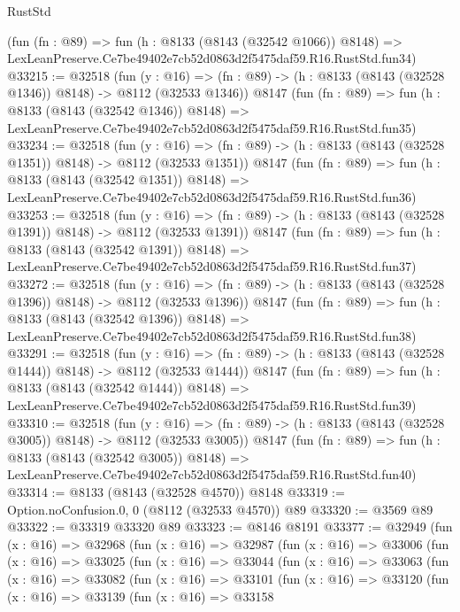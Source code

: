 \begin{lexlean}{RustStd}
\begin{coremodule}
    (fun (fn : @89) =>
    fun (h : @8133 (@8143 (@32542 @1066)) @8148) =>
    LexLeanPreserve.Ce7be49402e7cb52d0863d2f5475daf59.R16.RustStd.fun34)
@33215 := @32518
    (fun (y : @16) =>
    (fn : @89) -> (h : @8133 (@8143 (@32528 @1346)) @8148) -> @8112 (@32533 @1346))
    @8147
    (fun (fn : @89) =>
    fun (h : @8133 (@8143 (@32542 @1346)) @8148) =>
    LexLeanPreserve.Ce7be49402e7cb52d0863d2f5475daf59.R16.RustStd.fun35)
@33234 := @32518
    (fun (y : @16) =>
    (fn : @89) -> (h : @8133 (@8143 (@32528 @1351)) @8148) -> @8112 (@32533 @1351))
    @8147
    (fun (fn : @89) =>
    fun (h : @8133 (@8143 (@32542 @1351)) @8148) =>
    LexLeanPreserve.Ce7be49402e7cb52d0863d2f5475daf59.R16.RustStd.fun36)
@33253 := @32518
    (fun (y : @16) =>
    (fn : @89) -> (h : @8133 (@8143 (@32528 @1391)) @8148) -> @8112 (@32533 @1391))
    @8147
    (fun (fn : @89) =>
    fun (h : @8133 (@8143 (@32542 @1391)) @8148) =>
    LexLeanPreserve.Ce7be49402e7cb52d0863d2f5475daf59.R16.RustStd.fun37)
@33272 := @32518
    (fun (y : @16) =>
    (fn : @89) -> (h : @8133 (@8143 (@32528 @1396)) @8148) -> @8112 (@32533 @1396))
    @8147
    (fun (fn : @89) =>
    fun (h : @8133 (@8143 (@32542 @1396)) @8148) =>
    LexLeanPreserve.Ce7be49402e7cb52d0863d2f5475daf59.R16.RustStd.fun38)
@33291 := @32518
    (fun (y : @16) =>
    (fn : @89) -> (h : @8133 (@8143 (@32528 @1444)) @8148) -> @8112 (@32533 @1444))
    @8147
    (fun (fn : @89) =>
    fun (h : @8133 (@8143 (@32542 @1444)) @8148) =>
    LexLeanPreserve.Ce7be49402e7cb52d0863d2f5475daf59.R16.RustStd.fun39)
@33310 := @32518
    (fun (y : @16) =>
    (fn : @89) -> (h : @8133 (@8143 (@32528 @3005)) @8148) -> @8112 (@32533 @3005))
    @8147
    (fun (fn : @89) =>
    fun (h : @8133 (@8143 (@32542 @3005)) @8148) =>
    LexLeanPreserve.Ce7be49402e7cb52d0863d2f5475daf59.R16.RustStd.fun40)
@33314 := @8133 (@8143 (@32528 @4570)) @8148
@33319 := Option.noConfusion.{0, 0} (@8112 (@32533 @4570)) @89
@33320 := @3569 @89
@33322 := @33319 @33320 @89
@33323 := @8146 @8191
@33377 := @32949
    (fun (x : @16) =>
    @32968
      (fun (x : @16) =>
      @32987
        (fun (x : @16) =>
        @33006
          (fun (x : @16) =>
          @33025
            (fun (x : @16) =>
            @33044
              (fun (x : @16) =>
              @33063
                (fun (x : @16) =>
                @33082
                  (fun (x : @16) =>
                  @33101
                    (fun (x : @16) =>
                    @33120
                      (fun (x : @16) =>
                      @33139
                        (fun (x : @16) =>
                        @33158

\end{coremodule}
\end{lexlean}
